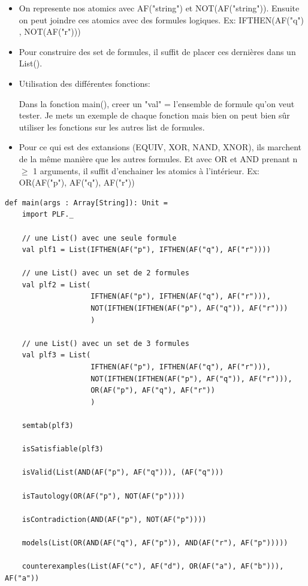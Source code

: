 \documentclass[a4paper, 11pt]{article}
\begin{document}
\begin{itemize}
\item
On represente nos atomics avec AF("string") et NOT(AF("string")).
Ensuite on peut joindre ces atomics avec des formules logiques. 
Ex: IFTHEN(AF("q") , NOT(AF("r"))) 

\item
Pour construire des set de formules, il suffit de placer ces dernières dans un List().

\item
Utilisation des différentes fonctions:

Dans la fonction main(), creer un "val" = l'ensemble de formule qu'on veut tester.
Je mets un exemple de chaque fonction mais bien on peut bien sûr utiliser les fonctions sur les autres list de formules.

\item
Pour ce qui est des extansions (EQUIV, XOR, NAND, XNOR), ils marchent de la même manière que les autres formules.
Et avec OR et AND prenant n $\geq$ 1 arguments, il suffit d'enchainer les atomics à l'intérieur. Ex: OR(AF("p"), AF("q"), AF("r"))

\end{itemize}
\begin{verbatim}
def main(args : Array[String]): Unit = 
    import PLF._

    // une List() avec une seule formule
    val plf1 = List(IFTHEN(AF("p"), IFTHEN(AF("q"), AF("r"))))

    // une List() avec un set de 2 formules
    val plf2 = List(
                    IFTHEN(AF("p"), IFTHEN(AF("q"), AF("r"))), 
                    NOT(IFTHEN(IFTHEN(AF("p"), AF("q")), AF("r")))
                    )
    
    // une List() avec un set de 3 formules
    val plf3 = List(
                    IFTHEN(AF("p"), IFTHEN(AF("q"), AF("r"))), 
                    NOT(IFTHEN(IFTHEN(AF("p"), AF("q")), AF("r"))), 
                    OR(AF("p"), AF("q"), AF("r"))
                    )

    semtab(plf3)

    isSatisfiable(plf3)

    isValid(List(AND(AF("p"), AF("q"))), (AF("q")))

    isTautology(OR(AF("p"), NOT(AF("p"))))

    isContradiction(AND(AF("p"), NOT(AF("p"))))

    models(List(OR(AND(AF("q"), AF("p")), AND(AF("r"), AF("p")))))

    counterexamples(List(AF("c"), AF("d"), OR(AF("a"), AF("b"))), AF("a"))
\end{verbatim}
\end{document}

